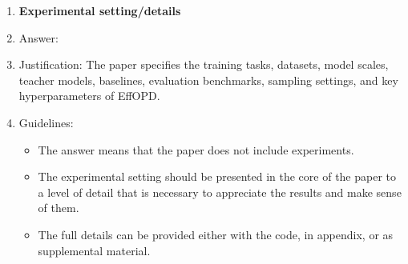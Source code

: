 \documentclass{article}
\begin{document}
\begin{enumerate}
\item {\bf Experimental setting/details}
    \item[] Answer: \answerYes{}
    \item[] Justification: The paper specifies the training tasks, datasets, model scales, teacher models, baselines, evaluation benchmarks, sampling settings, and key hyperparameters of EffOPD.
    \item[] Guidelines:
    \begin{itemize}
        \item The answer \answerNA{} means that the paper does not include experiments.
        \item The experimental setting should be presented in the core of the paper to a level of detail that is necessary to appreciate the results and make sense of them.
        \item The full details can be provided either with the code, in appendix, or as supplemental material.
    \end{itemize}


\end{enumerate}
\end{document}
